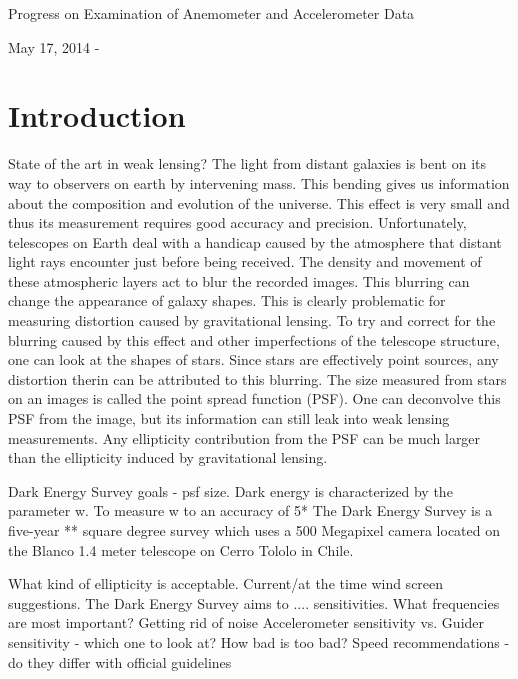 \documentclass{article}
\begin{document}
\centerline{\large Progress on Examination of Anemometer and Accelerometer Data}
\centerline{May 17, 2014 - }


\section{Introduction}
State of the art in weak lensing?
	The light from distant galaxies is bent on its way to observers on earth by intervening mass. This bending gives us information about the composition and evolution of the universe. This effect is very small and thus its measurement requires good accuracy and precision. Unfortunately, telescopes on Earth deal with a handicap caused by the atmosphere that distant light rays encounter just before being received. The density and movement of these atmospheric layers act to blur the recorded images. This blurring can change the appearance of galaxy shapes. This is clearly problematic for measuring distortion caused by gravitational lensing. To try and correct for the blurring caused by this effect and other imperfections of the telescope structure, one can look at the shapes of stars. Since stars are effectively point sources, any distortion therin can be attributed to this blurring. The size measured from stars on an images is called the point spread function (PSF). One can deconvolve this PSF from the image, but its information can still leak into weak lensing measurements. 
	Any ellipticity contribution from the PSF can be much larger than the ellipticity induced by gravitational lensing. 
	

Dark Energy Survey goals - psf size.
	Dark energy is characterized by the parameter w. To measure w to an accuracy of 5*%
	The Dark Energy Survey is a five-year ** square degree survey which uses a 500 Megapixel camera located on the Blanco 1.4 meter telescope on Cerro Tololo in Chile. 
	
What kind of ellipticity is acceptable.
Current/at the time wind screen suggestions.
The Dark Energy Survey aims to .... sensitivities.
What frequencies are most important?
Getting rid of noise
Accelerometer sensitivity vs. Guider sensitivity - which one to look at?
How bad is too bad?
Speed recommendations - do they differ with official guidelines
\end{document}
